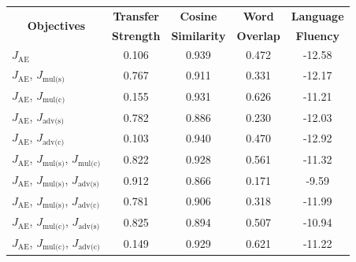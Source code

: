 \documentclass[letterpaper]{article} %
\newcommand{\tabh}[1]{\multicolumn{1}{c|}{\textbf{#1}}}
\newcommand{\tabc}[2]{\multicolumn{1}{|c||}{\multirow{#1}{*}{\textbf{#2}}}}
\newcommand{\loss}[1]{J_{\text{#1}}}
\begin{document}
\begin{table}[ht]
	\centering
	\begin{tabular}{| l || c | c | c | c |}
		\hline
		\tabc{2}{Objectives}                                                            & \tabh{Transfer} & \tabh{Cosine}     & \tabh{Word}    & \tabh{Language} \\
		                                                                                & \tabh{Strength} & \tabh{Similarity} & \tabh{Overlap} & \tabh{Fluency}  \\
		\hline
		\hline
		$\loss{AE}$                                                                     & 0.106           & 0.939             & 0.472          & -12.58          \\
		\hline
		$\loss{AE}$, $\loss{mul(s)}$                                                    & 0.767           & 0.911             & 0.331          & -12.17          \\
		\hline
		$\loss{AE}$, $\loss{mul(c)}$                                                    & 0.155           & 0.931             & 0.626          & -11.21          \\
		\hline
		$\loss{AE}$, $\loss{adv(s)}$                                                    & 0.782           & 0.886             & 0.230          & -12.03          \\
		\hline
		$\loss{AE}$, $\loss{adv(c)}$                                                    & 0.103           & 0.940             & 0.470          & -12.92          \\
		\hline
		$\loss{AE}$, $\loss{mul(s)}$, $\loss{mul(c)}$                                   & 0.822           & 0.928             & 0.561          & -11.32          \\
		\hline
		$\loss{AE}$, $\loss{mul(s)}$, $\loss{adv(s)}$                                   & 0.912           & 0.866             & 0.171          & -9.59           \\
		\hline
		$\loss{AE}$, $\loss{mul(s)}$, $\loss{adv(c)}$                                   & 0.781           & 0.906             & 0.318          & -11.99          \\
		\hline
		$\loss{AE}$, $\loss{mul(c)}$, $\loss{adv(s)}$                                   & 0.825           & 0.894             & 0.507          & -10.94          \\
		\hline
		$\loss{AE}$, $\loss{mul(c)}$, $\loss{adv(c)}$                                   & 0.149           & 0.929             & 0.621          & -11.22          \\

\end{tabular}
\end{table}
\end{document}
